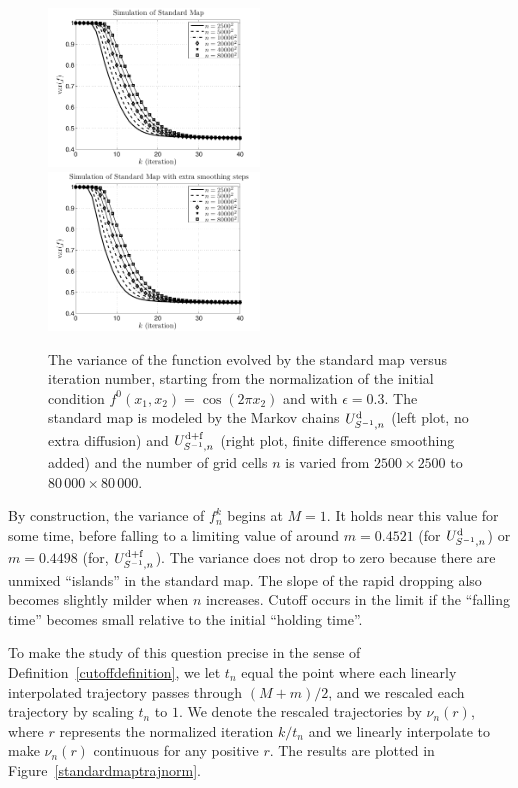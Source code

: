 \documentclass{aims}
\theoremstyle{definition}
\begin{document}
\begin{figure}
    \centerline{
      \includegraphics[width=0.5\textwidth,trim=0 0 0 22,clip=true]{standardmapcutoff}
      \includegraphics[width=0.5\textwidth,trim=0 0 0 22,clip=true]{standardmapcutoffwithsmoothing}
    }
    \caption{\label{standardmaptraj} The variance of the function
      evolved by the standard map versus iteration number, starting
      from the normalization of the initial condition
      $f^0(x_1,x_2)=\cos(2 \pi x_2)$ and with $\epsilon=0.3$. The
      standard map is modeled by the Markov chains $U_{S^{-1},n}^{\rm
        d}$ (left plot, no extra diffusion) and $U_{S^{-1},n}^{\rm
        d+f}$ (right plot, finite difference smoothing added) and the
      number of grid cells $n$ is varied from $2500 \times 2500$ to
      $80\,000 \times 80\,000$.}
\end{figure}

By construction, the variance of $f_n^k$ begins at $M = 1$. It holds
near this value for some time, before falling to a limiting value of
around $m = 0.4521$ (for $U_{S^{-1},n}^{\rm d}$) or $m = 0.4498$ (for,
$U_{S^{-1},n}^{\rm d+f}$). The variance does not drop to zero because
there are unmixed ``islands'' in the standard map. The slope of the
rapid dropping also becomes slightly milder when $n$ increases. Cutoff
occurs in the limit if the ``falling time'' becomes small relative to
the initial ``holding time''.

To make the study of this question precise in the sense of
Definition~\ref{cutoffdefinition}, we let $t_n$ equal the point where
each linearly interpolated trajectory passes through $(M+m)/2$, and we
rescaled each trajectory by scaling $t_n$ to $1$. We denote the
rescaled trajectories by $\nu_n(r)$, where $r$ represents the
normalized iteration $k / t_n$ and we linearly interpolate to make
$\nu_n(r)$ continuous for any positive $r$. The results are plotted in
Figure~\ref{standardmaptrajnorm}.
\end{document}
